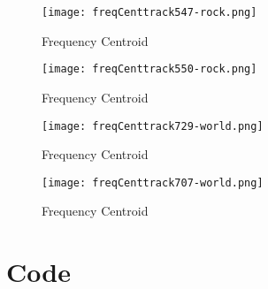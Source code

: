 \documentclass{article} %
\begin{document}
\begin{figure}[H]
\centering
\texttt{[image: freqCenttrack547-rock.png]}
\caption{Frequency Centroid}
\label{fig:cent547}
\end{figure}


\begin{figure}[H]
\centering
\texttt{[image: freqCenttrack550-rock.png]}
\caption{Frequency Centroid}
\label{fig:cent550}
\end{figure}


\begin{figure}[H]
\centering
\texttt{[image: freqCenttrack729-world.png]}
\caption{Frequency Centroid}
\label{fig:cent729}
\end{figure}


\begin{figure}[H]
\centering
\texttt{[image: freqCenttrack707-world.png]}
\caption{Frequency Centroid}
\label{fig:cent707}
\end{figure}


\clearpage
\section{Code}

















\end{document}
